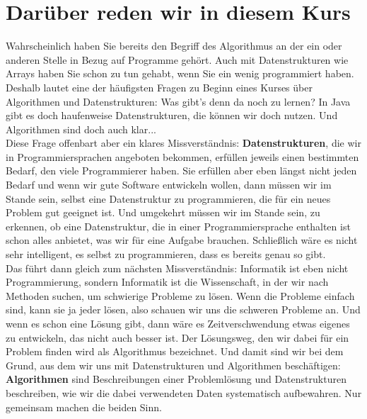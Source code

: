\section{Darüber reden wir in diesem Kurs}

Wahrscheinlich haben Sie bereits den Begriff des Algorithmus an der ein oder anderen Stelle in Bezug auf Programme gehört. Auch mit Datenstrukturen wie Arrays haben Sie schon zu tun gehabt, wenn Sie ein wenig programmiert haben. Deshalb lautet eine der häufigsten Fragen zu Beginn eines Kurses über Algorithmen und Datenstrukturen: \glqq{}Was gibt's denn da noch zu lernen? In Java gibt es doch haufenweise Datenstrukturen, die können wir doch nutzen. Und Algorithmen sind doch auch klar...\grqq{}\\

Diese Frage offenbart aber ein klares Missverständnis: \textbf{Datenstrukturen}, die wir in Programmiersprachen angeboten bekommen, erfüllen jeweils einen bestimmten Bedarf, den viele Programmierer haben. Sie erfüllen aber eben längst nicht jeden Bedarf und wenn wir gute Software entwickeln wollen, dann müssen wir im Stande sein, selbst eine Datenstruktur zu programmieren, die für ein neues Problem gut geeignet ist. Und umgekehrt müssen wir im Stande sein, zu erkennen, ob eine Datenstruktur, die in einer Programmiersprache enthalten ist schon alles anbietet, was wir für eine Aufgabe brauchen. Schließlich wäre es nicht sehr intelligent, es selbst zu programmieren, dass es bereits genau so gibt.\\

Das führt dann gleich zum nächsten Missverständnis: Informatik ist eben nicht Programmierung, sondern Informatik ist die Wissenschaft, in der wir nach Methoden suchen, um schwierige Probleme zu lösen. Wenn die Probleme einfach sind, kann sie ja jeder lösen, also schauen wir uns die schweren Probleme an. Und wenn es schon eine Lösung gibt, dann wäre es Zeitverschwendung etwas eigenes zu entwickeln, das nicht auch besser ist. Der Lösungsweg, den wir dabei für ein Problem finden wird als Algorithmus bezeichnet. Und damit sind wir bei dem Grund, aus dem wir uns mit Datenstrukturen und Algorithmen beschäftigen: \textbf{Algorithmen} sind Beschreibungen einer Problemlösung und Datenstrukturen beschreiben, wie wir die dabei verwendeten Daten systematisch aufbewahren. Nur gemeinsam machen die beiden Sinn.\\

